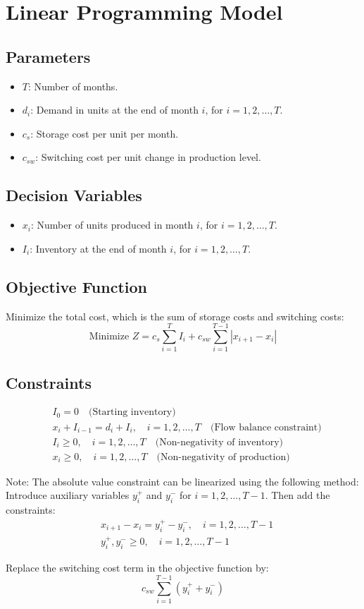 \documentclass{article}
\begin{document}
\section*{Linear Programming Model}

\subsection*{Parameters}
\begin{itemize}
    \item $T$: Number of months.
    \item $d_i$: Demand in units at the end of month $i$, for $i = 1, 2, \ldots, T$.
    \item $c_s$: Storage cost per unit per month.
    \item $c_{sw}$: Switching cost per unit change in production level.
\end{itemize}

\subsection*{Decision Variables}
\begin{itemize}
    \item $x_i$: Number of units produced in month $i$, for $i = 1, 2, \ldots, T$.
    \item $I_i$: Inventory at the end of month $i$, for $i = 1, 2, \ldots, T$.
\end{itemize}

\subsection*{Objective Function}
Minimize the total cost, which is the sum of storage costs and switching costs:
\[
\text{Minimize } Z = c_s \sum_{i=1}^{T} I_i + c_{sw} \sum_{i=1}^{T-1} |x_{i+1} - x_i|
\]

\subsection*{Constraints}
\begin{align}
    & I_0 = 0 \quad \text{(Starting inventory)} \\
    & x_i + I_{i-1} = d_i + I_i, \quad i = 1, 2, \ldots, T \quad \text{(Flow balance constraint)} \\
    & I_i \geq 0, \quad i = 1, 2, \ldots, T \quad \text{(Non-negativity of inventory)} \\
    & x_i \geq 0, \quad i = 1, 2, \ldots, T \quad \text{(Non-negativity of production)}
\end{align}

Note: The absolute value constraint can be linearized using the following method:
Introduce auxiliary variables $y_i^{+}$ and $y_i^{-}$ for $i=1,2,\ldots,T-1$. Then add the constraints:
\begin{align}
    & x_{i+1} - x_i = y_i^{+} - y_i^{-}, \quad i = 1, 2, \ldots, T-1 \\
    & y_i^{+}, y_i^{-} \geq 0, \quad i = 1, 2, \ldots, T-1
\end{align}

Replace the switching cost term in the objective function by:
\[
c_{sw} \sum_{i=1}^{T-1} (y_i^{+} + y_i^{-})
\]
\end{document}
